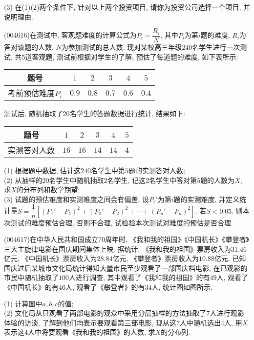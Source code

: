 (3) 在(1)(2)两个条件下, 针对以上两个投资项目, 请你为投资公司选择一个项目, 并说明理由.
\item (004616)在测试中, 客观题难度的计算公式为$P_i=\dfrac{R_i}N$, 其中$P_i$为第$i$题的难度, $R_i$为答对该题的人数, $N$为参加测试的总人数. 现对某校高三年级$240$名学生进行一次测试, 共$5$道客观题, 测试前根据对学生的了解, 预估了每道题的难度, 如下表所示:
\begin{center}
    \begin{tabular}{|c|c|c|c|c|c|}
        \hline
        题号 & $1$ & $2$ & $3$ & $4$ & $5$ \\ \hline
        考前预估难度$P_i$ & $0.9$ & $0.8$ & $0.7$ & $0.6$ & $0.4$ \\ \hline       
    \end{tabular}
\end{center}
测试后, 随机抽取了$20$名学生的答题数据进行统计, 结果如下:
\begin{center}
    \begin{tabular}{|c|c|c|c|c|c|}
        \hline
        题号 & $1$ & $2$ & $3$ & $4$ & $5$ \\ \hline
        实测答对人数 & $16$ & $16$ & $14$ & $14$ & $4$ \\ \hline       
    \end{tabular}
\end{center}
(1) 根据题中数据, 估计这$240$名学生中第$5$题的实测答对人数;\\
(2) 从抽样的$20$名学生中随机抽取$2$名学生, 记这$2$名学生中答对第$5$题的人数为$X$, 求$X$的分布列和数学期望;\\
(3) 试题的预估难度和实测难度之间会有偏差, 设$P_i'$为第$i$题的实测难度, 并定义统计量$S=\dfrac 1n[(P_1'-P_1)^2+(P_2'-P_2)^2+\cdots+(P_n'-P_n)^2]$, 若$S<0.05$, 则本次测试的难度预估合理, 否则不合理, 试检验本次测试对难度的预估是否合理.
\item (004617)在中华人民共和国成立$70$周年时, 《我和我的祖国》《中国机长》《攀登者》三大主旋律电影在国庆期间集体上映. 据统计, 《我和我的祖国》票房收入为$31.46$亿元, 《中国机长》票房收入为$28.84$亿元, 《攀登者》票房收入为$10.88$亿元. 已知国庆过后某城市文化局统计得知大量市民至少观看了一部国庆档电影, 在已观影的市民中随机抽取了$100$人进行调查, 其中观看了《我和我的祖国》的有$49$人, 观看了《中国机长》的有$46$人, 观看了《攀登者》的有$34$人, 统计图如图所示.
\begin{center}
\end{center}
(1) 计算图中$a, b, c$的值;\\
(2) 文化局从只观看了两部电影的观众中采用分层抽样的方法抽取了$7$人进行观影体验的访谈, 了解到他们均表示要观看第三部电影, 现从这$7$人中随机选出$4$人, 用$X$表示这$4$人中将要观看《我和我的祖国》的人数, 求$X$的分布列.
